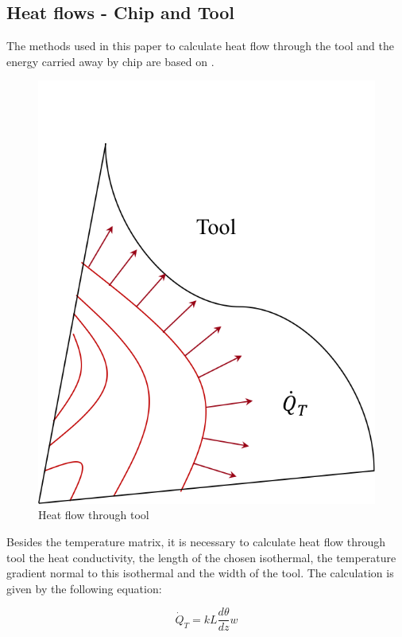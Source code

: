 	\subsection{Heat flows - Chip and Tool}
	\label{heatflows}

	The methods used in this paper to calculate heat flow through the tool and the energy carried away by chip are based on \cite{boothroyd1963temperatures}.

	\begin{figure}[H]
		\centering
		\captionsetup{justification=centering}
		\includegraphics[scale=0.75]{Cap4/ToolHeat.png}
		\caption{Heat flow through tool}
		\label{fig:heattool}
	\end{figure}

	Besides the temperature matrix, it is necessary to calculate heat flow through tool the heat conductivity, the length of the chosen isothermal, the temperature gradient normal to this isothermal and the width of the tool. The calculation is given by the following equation:

	\begin{equation} 
	\label{eq_heattool}
		\dot{Q}_{T} = kL\frac{d\theta}{dz}w
	\end{equation}

